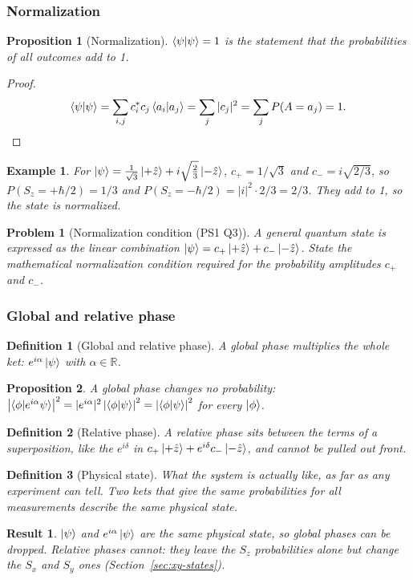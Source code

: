 \documentclass{article}
\newtheorem{definition}{Definition}
\newtheorem{problem}{Problem}
\newtheorem*{example}{Example}
\newtheorem{proposition}{Proposition}
\newtheorem{result}{Result}
\begin{document}
\subsubsection{Normalization}
\begin{proposition}[Normalization]
    $\braket{\psi|\psi} = 1$ is the statement that the probabilities of all outcomes add to 1.
\end{proposition}
\begin{proof}
    \[\braket{\psi|\psi} = \sum_{i,j}c_i^*c_j\braket{a_i|a_j} = \sum_j|c_j|^2 = \sum_j P(A = a_j) = 1.\]
\end{proof}
\begin{example}
    For $\ket{\psi} = \frac{1}{\sqrt{3}}\ket{+\hat{z}} + i\sqrt{\frac{2}{3}}\ket{-\hat{z}}$, $c_+ = 1/\sqrt{3}$ and $c_- = i\sqrt{2/3}$, so $P(S_z = +\hbar/2) = 1/3$ and $P(S_z = -\hbar/2) = |i|^2\cdot 2/3 = 2/3$. They add to 1, so the state is normalized.
\end{example}
\begin{problem}[Normalization condition (PS1 Q3)]
    A general quantum state is expressed as the linear combination $\ket{\psi} = c_+\ket{+\hat{z}} + c_-\ket{-\hat{z}}$. State the mathematical normalization condition required for the probability amplitudes $c_+$ and $c_-$.
\end{problem}

\subsubsection{Global and relative phase}
\begin{definition}[Global and relative phase]
    A global phase multiplies the whole ket: $e^{i\alpha}\ket{\psi}$ with $\alpha \in \mathbb{R}$. 
\end{definition}
\begin{proposition}
    A global phase changes no probability: $\left|\braket{\phi|e^{i\alpha}\psi}\right|^2 = |e^{i\alpha}|^2\left|\braket{\phi|\psi}\right|^2 = \left|\braket{\phi|\psi}\right|^2$ for every $\ket{\phi}$.
\end{proposition}
\begin{definition}[Relative phase]
    A relative phase sits between the terms of a superposition, like the $e^{i\delta}$ in $c_+\ket{+\hat{z}} + e^{i\delta}c_-\ket{-\hat{z}}$, and cannot be pulled out front.
\end{definition}
\begin{definition}[Physical state]
    What the system is actually like, as far as any experiment can tell. Two kets that give the same probabilities for all measurements describe the same physical state.
\end{definition}
\begin{result}
    $\ket{\psi}$ and $e^{i\alpha}\ket{\psi}$ are the same physical state, so global phases can be dropped. Relative phases cannot: they leave the $S_z$ probabilities alone but change the $S_x$ and $S_y$ ones (Section~\ref{sec:xy-states}).
\end{result}
\end{document}

